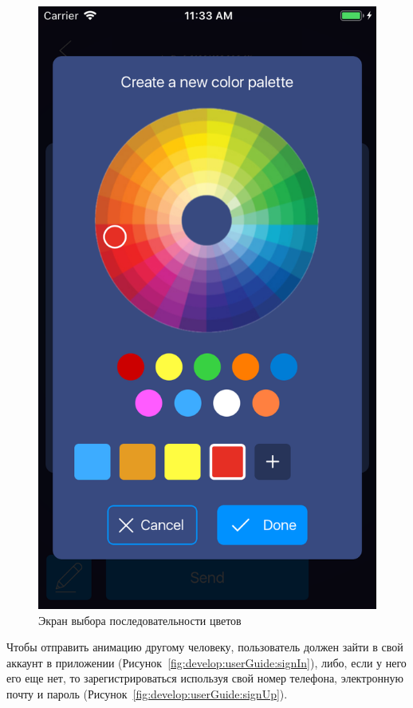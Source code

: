 \begin{figure}[H]
\centering
	\includegraphics[scale=0.2]{figures/userGuide/editingColorSequence.png}
	\caption{Экран выбора последовательности цветов}
	\label{fig:develop:userGuide:editingColorSequence}
\end{figure}

Чтобы отправить анимацию другому человеку, пользователь должен зайти в свой аккаунт в приложении (Рисунок~\ref{fig:develop:userGuide:signIn}), либо, если у него его еще нет, то зарегистрироваться используя свой номер телефона, электронную почту и пароль (Рисунок~\ref{fig:develop:userGuide:signUp}).

